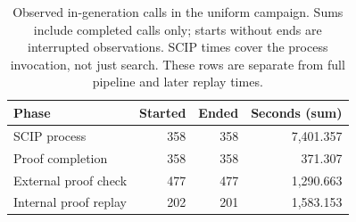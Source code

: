 \begin{table}[tb]
\centering
\caption{Observed in-generation calls in the uniform campaign. Sums include completed calls only; starts without ends are interrupted observations. SCIP times cover the process invocation, not just search. These rows are separate from full pipeline and later replay times.}
\label{tab:generation-phases}
\begin{tabular}{lrrr}
\toprule
Phase & Started & Ended & Seconds (sum) \\
\midrule
SCIP process & 358 & 358 & 7,401.357 \\
Proof completion & 358 & 358 & 371.307 \\
External proof check & 477 & 477 & 1,290.663 \\
Internal proof replay & 202 & 201 & 1,583.153 \\
\bottomrule
\end{tabular}
\end{table}
